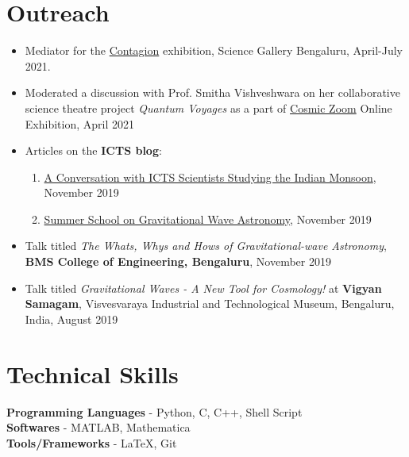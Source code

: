 \documentclass[margin, centered]{res}
\begin{document}
\begin{resume}
\begin{itemize}[leftmargin=*]
\end{itemize}
\section{Outreach}
\begin{itemize}[leftmargin=*]
	\item Mediator for the \href{https://bengaluru.sciencegallery.com/contagion-archive}{Contagion} exhibition, Science Gallery Bengaluru, April-July 2021.
	\item Moderated a discussion with Prof. Smitha Vishveshwara on her collaborative science theatre project \textit{Quantum Voyages} as a part of \href{https://cosmic-zoom.in/}{Cosmic Zoom} Online Exhibition, April 2021
	\item Articles on the \textbf{ICTS blog}:
	\begin{enumerate}
		\item \href{https://blog.icts.res.in/blog/conversation-icts-scientists-studying-indian-monsoon}{A Conversation with ICTS Scientists Studying the Indian Monsoon}, November 2019
		\item \href{https://blog.icts.res.in/blog/summer-school-gravitational-wave-astronomy}{Summer School on Gravitational Wave Astronomy}, November 2019
	\end{enumerate}	
	\item Talk titled \textit{The Whats, Whys and Hows of Gravitational-wave Astronomy}, \textbf{BMS College of Engineering, Bengaluru}, November 2019
	\item Talk titled \textit{Gravitational Waves - A New Tool for Cosmology!} at \textbf{Vigyan Samagam}, Visvesvaraya Industrial and Technological Museum, Bengaluru, India, August 2019

\end{itemize}




\section{Technical \hspace{2mm} Skills}
\textbf{Programming Languages} - Python, C, C++, Shell Script\\
\textbf{Softwares} - MATLAB, Mathematica \\
\textbf{Tools/Frameworks} - \LaTeX, Git




\end{resume}
\end{document}

